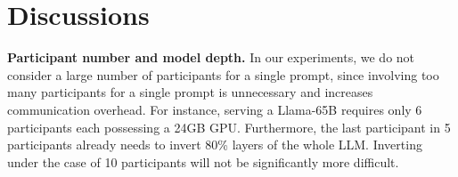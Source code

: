 \section{Discussions}

\noindent \textbf{Participant number and model depth.} In our experiments, we do not consider a large number of participants for a single prompt, since involving too many participants for a single prompt is unnecessary and increases communication overhead. For instance, serving a Llama-65B requires only 6 participants each possessing a 24GB GPU. Furthermore, the last participant in 5 participants already needs to invert 80\% layers of the whole LLM. Inverting under the case of 10 participants will not be significantly more difficult. 




